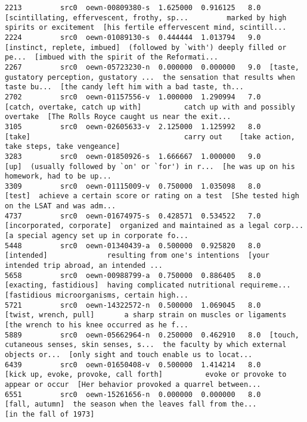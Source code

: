 \documentclass[a4paper,10pt,onecolumn,oneside,openright]{article}
\begin{document}
\begin{verbatim}
2213         src0  oewn-00809380-s  1.625000  0.916125   8.0  [scintillating, effervescent, frothy, sp...         marked by high spirits or excitement  [his fertile effervescent mind, scintill...
2224         src0  oewn-01089130-s  0.444444  1.013794   9.0                  [instinct, replete, imbued]  (followed by `with') deeply filled or pe...  [imbued with the spirit of the Reformati...
2267         src0  oewn-05723230-n  0.000000  0.000000   9.0  [taste, gustatory perception, gustatory ...  the sensation that results when taste bu...  [the candy left him with a bad taste, th...
2702         src0  oewn-01157556-v  1.000000  1.290994   7.0             [catch, overtake, catch up with]          catch up with and possibly overtake  [The Rolls Royce caught us near the exit...
3105         src0  oewn-02605633-v  2.125000  1.125992   8.0                                       [take]                                    carry out    [take action, take steps, take vengeance]
3283         src0  oewn-01850926-s  1.666667  1.000000   9.0                                         [up]  (usually followed by `on' or `for') in r...  [he was up on his homework, had to be up...
3309         src0  oewn-01115009-v  0.750000  1.035098   8.0                                       [test]  achieve a certain score or rating on a test  [She tested high on the LSAT and was adm...
4737         src0  oewn-01674975-s  0.428571  0.534522   7.0                    [incorporated, corporate]  organized and maintained as a legal corp...  [a special agency set up in corporate fo...
5448         src0  oewn-01340439-a  0.500000  0.925820   8.0                                   [intended]              resulting from one's intentions  [your intended trip abroad, an intended ...
5658         src0  oewn-00988799-a  0.750000  0.886405   8.0                       [exacting, fastidious]  having complicated nutritional requireme...  [fastidious microorganisms, certain high...
5721         src0  oewn-14322572-n  0.500000  1.069045   8.0                        [twist, wrench, pull]       a sharp strain on muscles or ligaments  [the wrench to his knee occurred as he f...
5889         src0  oewn-05662964-n  0.250000  0.462910   8.0  [touch, cutaneous senses, skin senses, s...  the faculty by which external objects or...  [only sight and touch enable us to locat...
6439         src0  oewn-01650408-v  0.500000  1.414214   8.0        [kick up, evoke, provoke, call forth]          evoke or provoke to appear or occur  [Her behavior provoked a quarrel between...
6551         src0  oewn-15261656-n  0.000000  0.000000   8.0                               [fall, autumn]  the season when the leaves fall from the...                        [in the fall of 1973]

\end{verbatim}
\end{document}
